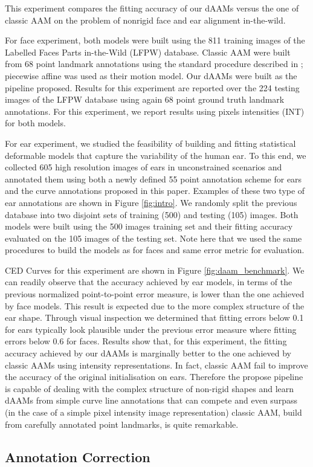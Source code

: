 This experiment compares the fitting accuracy of our dAAMs versus the one of classic AAM on the problem of nonrigid face and ear alignment in-the-wild. 

For face experiment, both models were built using the 811 training images of the Labelled
Faces Parts in-the-Wild (LFPW) \cite{Asthana2014} database. Classic AAM were built from 68 point landmark annotations using the standard procedure described in \cite{Cootes2001,Matthews2004}; piecewise affine was used as their motion model. Our dAAMs were built as the pipeline proposed. Results for this experiment are reported over the 224 testing images of the LFPW database using again 68 point ground truth landmark annotations. For this experiment, we report results using pixels intensities (INT) for both models. 

For ear experiment, we studied the feasibility of building and fitting statistical deformable models that capture the variability of the human ear. To this end, we collected 605 high resolution images of ears in unconstrained scenarios and annotated them using both a newly defined 55 point annotation scheme for ears and the curve annotations proposed in this paper. Examples of these two type of ear annotations are shown in Figure \ref{fig:intro}. We randomly split the previous database into two disjoint sets of training (500) and testing (105) images. Both models were built using the 500 images training set and their fitting accuracy evaluated on the 105 images of the testing set. Note here that we used the same procedures to build the models as for faces and same error metric for evaluation.

CED Curves for this experiment are shown in Figure \ref{fig:daam_benchmark}. We can readily observe that the accuracy achieved by ear models, in terms of the previous normalized point-to-point error measure, is lower than the one achieved by face models. This result is expected due to the more complex structure of the ear shape. Through visual inspection we determined that fitting errors below 0.1 for ears typically look plausible under the previous error measure where fitting errors below 0.6 for faces. Results show that, for this experiment, the fitting accuracy achieved by our dAAMs is marginally better to the one achieved by classic AAMs using intensity representations. In fact, classic AAM fail to improve the accuracy of the original initialisation on ears. Therefore the propose pipeline is capable of dealing with the complex structure of non-rigid shapes and learn dAAMs from simple curve line annotations that can compete and even surpass (in the case of a simple pixel intensity image representation) classic AAM, build from carefully annotated point landmarks, is quite remarkable.

\subsection{Annotation Correction}
\label{exp:qualitative}



